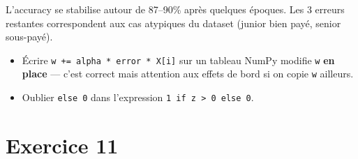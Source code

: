 L'accuracy se stabilise autour de 87--90\% apr\`{e}s quelques \'{e}poques. Les 3 erreurs restantes correspondent aux cas atypiques du dataset (junior bien pay\'{e}, senior sous-pay\'{e}).

\begin{attentionbox}
\begin{itemize}
    \item \'{E}crire \texttt{w += alpha * error * X[i]} sur un tableau NumPy modifie \texttt{w} \textbf{en place} --- c'est correct mais attention aux effets de bord si on copie \texttt{w} ailleurs.
    \item Oublier \texttt{else 0} dans l'expression \texttt{1 if z > 0 else 0}.
\end{itemize}
\end{attentionbox}

\section*{Exercice 11 \hfill \exoavance}

\separateur

